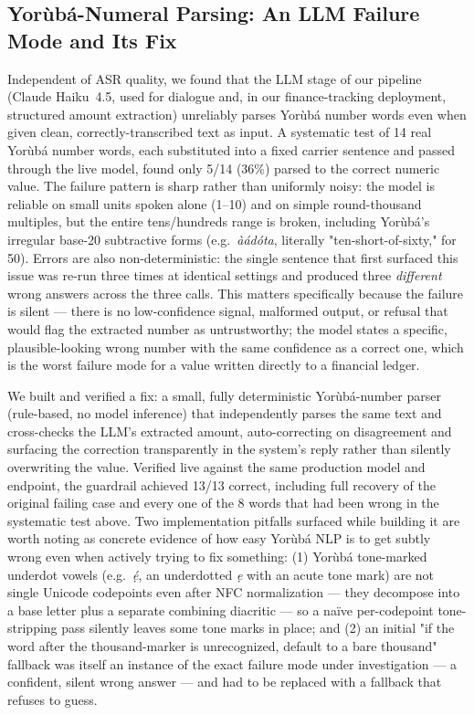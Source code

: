 \subsection{Yor\`ub\'a-Numeral Parsing: An LLM Failure Mode and Its Fix}
\label{sec:numeral-results}
Independent of ASR quality, we found that the LLM stage of our pipeline
(Claude Haiku~4.5, used for dialogue and, in our finance-tracking
deployment, structured amount extraction) unreliably parses Yor\`ub\'a
number words even when given clean, correctly-transcribed text as input.
A systematic test of 14 real Yor\`ub\'a number words, each substituted into
a fixed carrier sentence and passed through the live model, found only
5/14 (36\%) parsed to the correct numeric value. The failure pattern is
sharp rather than uniformly noisy: the model is reliable on small units
spoken alone (1--10) and on simple round-thousand multiples, but the
entire tens/hundreds range is broken, including Yor\`ub\'a's irregular
base-20 subtractive forms (e.g.\ \emph{\`a\'ad\'ota}, literally
"ten-short-of-sixty," for 50). Errors are also non-deterministic: the
single sentence that first surfaced this issue was re-run three times at
identical settings and produced three \emph{different} wrong answers
across the three calls. This matters specifically because the failure is
silent --- there is no low-confidence signal, malformed output, or refusal
that would flag the extracted number as untrustworthy; the model states a
specific, plausible-looking wrong number with the same confidence as a
correct one, which is the worst failure mode for a value written directly
to a financial ledger.

We built and verified a fix: a small, fully deterministic Yor\`ub\'a-number
parser (rule-based, no model inference) that independently parses the same
text and cross-checks the LLM's extracted amount, auto-correcting on
disagreement and surfacing the correction transparently in the system's
reply rather than silently overwriting the value. Verified live against
the same production model and endpoint, the guardrail achieved 13/13
correct, including full recovery of the original failing case and every
one of the 8 words that had been wrong in the systematic test above. Two
implementation pitfalls surfaced while building it are worth noting as
concrete evidence of how easy Yor\`ub\'a NLP is to get subtly wrong even
when actively trying to fix something: (1) Yor\`ub\'a tone-marked
underdot vowels (e.g.\ \emph{\'{\d{e}}}, an underdotted \emph{\d{e}} with
an acute tone mark) are not single Unicode
codepoints even after NFC normalization --- they decompose into a base
letter plus a separate combining diacritic --- so a na\"ive per-codepoint
tone-stripping pass silently leaves some tone marks in place; and (2) an
initial "if the word after the thousand-marker is unrecognized, default to
a bare thousand" fallback was itself an instance of the exact failure mode
under investigation --- a confident, silent wrong answer --- and had to be
replaced with a fallback that refuses to guess.

